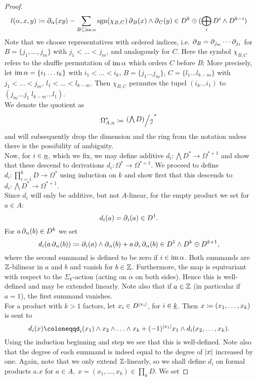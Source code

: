 \begin{prop}
\begin{proof}
\[ l(\alpha,x,y) \defas \del_\alpha(xy) - \sum_{B \subseteq \im \alpha} \sgn(\chi_{B,C}) %
  \del_B (x) \wedge \del_C (y) \in D^k \oplus ( \bigoplus_i D^i \wedge D^{k-i} ) \]
Note that we choose representatives with ordered indices, i.e. $\operatorname{\partial}_B= \operatorname{\partial}_{j_m} \cdots \operatorname{\partial}_{j_1}$ for $B = \{ j_1, \ldots, j_m \}$ with $j_1 < \ldots < j_m$, and analogously for $C$. Here the symbol $\chi_{B,C}$ refers to the shuffle permutation of $\operatorname{im} \alpha$ which orders $C$ before $B$; More precisely, let $\operatorname{im} \alpha = \{ i_1 \ldots i_k \}$ with $i_1 < \ldots < i_k$, $B = \{j_1 \ldots j_m \}$, $C = \{ l_1 \ldots l_{k-m} \}$ with $j_1 < \ldots < j_m$, $l_1 < \ldots < l_{k-m}$. Then $\chi_{B,C}$ permutes the tupel $(i_k \ldots i_1)$ to $(j_m \ldots j_1 \; l_{k-m} \ldots l_1)$.\\
We denote the quotient as%
\[ \omgn^* \coloneqq \bigmod {\left(\bigwedge D\right)} {\mathcal{I}} ^* \]%
and will subsequently drop the dimension and the ring from the notation unless there is the possibility of ambiguity.\\
Now, for $i \in \underline{n}$, which we fix, we may define additive $d_i: \bigwedge D^* \to \Omega^{*+1} $ and show that these descend to derivations ${d_i: \Omega^* \to \Omega^{*+1}}$. We proceed to define $d_i: \prod_{i=1}^k D \to \Omega^*$ using induction on $k$ and show first that this descends to $d_i: \bigwedge D^* \to \Omega^{*+1}$.\\
Since $d_i$ will only be additive, but not $A$-linear, for the empty product we set for $a \in A$:
\[
  d_i (a) = \operatorname{\partial}_i (a) \in D^1.
\]
For $a \operatorname{\partial}_\alpha (b) \in D^k$ we set
\[ d_i (a \operatorname{\partial}_\alpha (b)) \coloneqq  \operatorname{\partial}_i (a) \wedge \operatorname{\partial}_\alpha (b) + a \operatorname{\partial}_i \operatorname{\partial}_\alpha (b) \in D^1 \wedge D^k \oplus D^{k+1}, \]
where the second summand is defined to be zero if $i \in \operatorname{im} \alpha$. Both summands are $\mathbb{Z}$-bilinear in $a$ and $b$ and vanish for $b \in \mathbb{Z}$. Furthermore, the map is equivariant with respect to the $\Sigma_k$-action (acting on $\alpha$ on both sides). Hence this is well-defined and may be extended linearly. Note also that if $a \in \mathbb{Z}$ (in particular if $a = 1$), the first summand vanishes.
\\
For a product with $k>1$ factors, let $x_i \in D^{\left\vert x_i\right\vert}$, for $i \in \underline{k}$. Then $ x \coloneqq ( x_1 , \ldots , x_k ) $ is sent to
    \[ d_i (x) \coloneqq%
    d_i (x_1) \wedge x_2 \wedge \ldots \wedge x_k + %
    (-1)^{\abs{x_1}} x_1 \wedge d_i (x_2, \ldots, x_k). \]%
Using the induction beginning and step we see that this is well-defined. Note also that the degree of each summand is indeed equal to the degree of $\left\vert x\right\vert$ increased by one. Again, note that we only extend $\mathbb{Z}$-linearly, so we shall define $d_i$ on formal products $a.x$ for $a \in A, \; x = (x_1 , \ldots , x_k) \in \prod_k D$. We set

\end{proof}
\end{prop}
